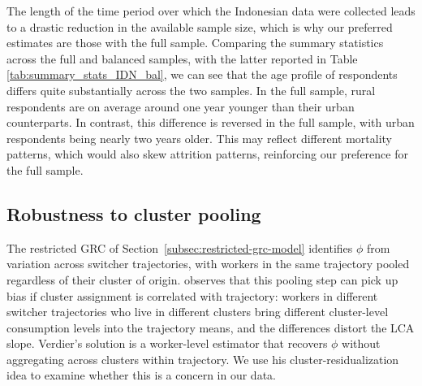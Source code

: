 The length of the time period over which the Indonesian data were collected leads to a drastic reduction in the available sample size, which is why our preferred estimates are those with the full sample. 
Comparing the summary statistics across the full and balanced samples, with the latter reported in Table \ref{tab:summary_stats_IDN_bal}, we can see that the age profile of respondents differs quite substantially across the two samples.
In the full sample, rural respondents are on average around one year younger than their urban counterparts. 
In contrast, this difference is reversed in the full sample, with urban respondents being nearly two years older. 
This may reflect different mortality patterns, which would also skew attrition patterns, reinforcing our preference for the full sample. 



\subsection{Robustness to cluster pooling}\label{subsec:verdier-robustness}

The restricted GRC of Section~\ref{subsec:restricted-grc-model} identifies $\phi$ from variation across switcher trajectories, with workers in the same trajectory pooled regardless of their cluster of origin.
\citet{verdierAverageTreatmentEffects2020a} observes that this pooling step can pick up bias if cluster assignment is correlated with trajectory: workers in different switcher trajectories who live in different clusters bring different cluster-level consumption levels into the trajectory means, and the differences distort the LCA slope.
Verdier's solution is a worker-level estimator that recovers $\phi$ without aggregating across clusters within trajectory.
We use his cluster-residualization idea to examine whether this is a concern in our data.

